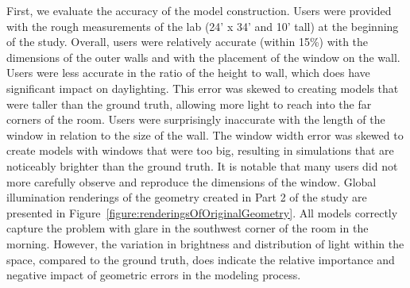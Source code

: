 \documentclass{article}
\begin{document}
First, we evaluate the accuracy of the model construction.
%
Users were provided with the rough measurements of the lab (24' x 34'
and 10' tall) at the beginning of the study. 
%
%
%
Overall, users were relatively accurate (within 15\%) with the
dimensions of the outer walls and with the placement of the window on
the wall.  Users were less accurate in the ratio of the height to
wall, which does have significant impact on daylighting.  
This error was skewed to creating models that were taller than the
ground truth, allowing more light to reach into the far corners of the
room.
%
Users were surprisingly inaccurate with the length of the window in
relation to the size of the wall.  The window width error was skewed
to create models with windows that were too big, resulting in
simulations that are noticeably brighter than the ground truth.
It is notable that many users did not more carefully observe and
reproduce the dimensions of the window.
%
Global illumination renderings of the geometry created in Part 2 of
the study are presented in
Figure~\ref{figure:renderingsOfOriginalGeometry}.  All models
correctly capture the problem with glare in the southwest corner of
the room in the morning.  However, the variation in brightness and
distribution of light within the space, compared to the ground truth,
does indicate the relative importance and negative impact of geometric
errors in the modeling process.
\end{document}
